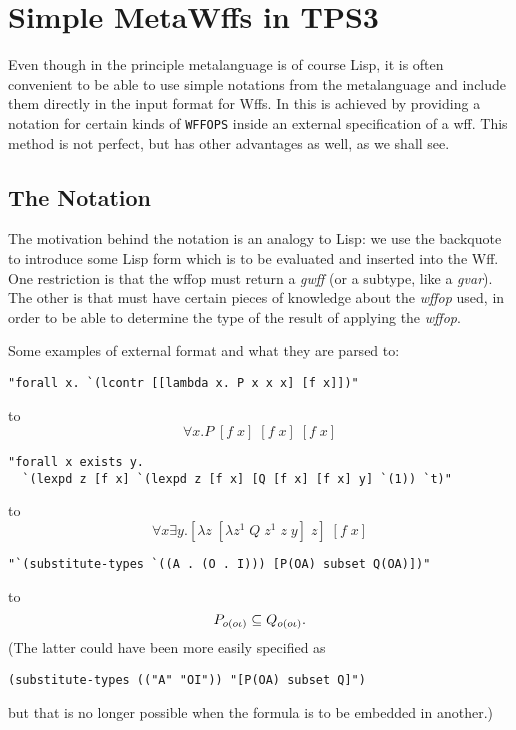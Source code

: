 \section{Simple MetaWffs in TPS3}

Even though in \TPS the principle metalanguage is of course Lisp, it is
often convenient to be able to use simple notations from the metalanguage
and include them directly in the input format for Wffs.  In \TPS this is
achieved by providing a notation for certain kinds of {\tt WFFOPS} inside
an external specification of a wff.  This method is not perfect, but has
other advantages as well, as we shall see.

\subsection{The Notation}

The motivation behind the notation is an analogy to Lisp: we use the
backquote to introduce some Lisp form which is to be evaluated and
inserted into the Wff.  One restriction is that the wffop must return
a {\it gwff} (or a subtype, like a {\it gvar}).  The other is that \TPS must
have certain pieces of knowledge about the {\it wffop} used, in order to be
able to determine the type of the result of applying the {\it wffop}.

Some examples of external format and what they are parsed to:
\begin{verbatim}
"forall x. `(lcontr [[lambda x. P x x x] [f x]])"
\end{verbatim}
to
$$\forall x.P\; [f\; x]\; [f\; x]\; [f\; x]$$

\begin{verbatim}
"forall x exists y.
  `(lexpd z [f x] `(lexpd z [f x] [Q [f x] [f x] y] `(1)) `t)"
\end{verbatim}
to
$$\forall x\exists y.[\lambda z\; [\lambda z^{1}\; Q\; z^{1}\; z\; y]\; z]\; [f\; x]$$

\begin{verbatim}
"`(substitute-types `((A . (O . I))) [P(OA) subset Q(OA)])"
\end{verbatim}
to
$$P_{o(o\iota)} \subseteq Q_{o(o\iota)}.$$
(The latter could have been more easily specified as
\begin{verbatim}
(substitute-types (("A" "OI")) "[P(OA) subset Q]")
\end{verbatim}
but that is no longer possible when the formula is to be embedded
in another.)


